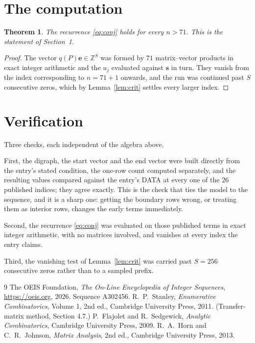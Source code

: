\documentclass[11pt,a4paper]{article}
\theoremstyle{plain}
\newtheorem{theorem}{Theorem}
\theoremstyle{definition}
\begin{document}
\section{The computation}

\begin{theorem}
The recurrence \eqref{eq:conj} holds for every $n>71$. This is the statement of
Section~1.
\end{theorem}

\begin{proof}
The vector $q(P)\mathbf{e}\in\mathbb{Z}^{S}$ was formed by $71$ matrix--vector
products in exact integer arithmetic and the $u_j$ evaluated against $\mathbf{s}$ in turn.
They vanish from the index corresponding to $n=71+1$ onwards, and the run was continued
past $S$ consecutive zeros, which by Lemma~\ref{lem:crit} settles every larger index.
\end{proof}

\section{Verification}

Three checks, each independent of the algebra above.

First, the digraph, the start vector and the end vector were built directly from the
entry's stated condition, the one-row count computed separately, and the resulting values
compared against the entry's DATA at every one of the $26$ published indices; they
agree exactly. This is the check that ties the model to the sequence, and it is a sharp one:
getting the boundary rows wrong, or treating them as interior rows, changes the early terms
immediately.

Second, the recurrence \eqref{eq:conj} was evaluated on those published terms in exact
integer arithmetic, with no matrices involved, and vanishes at every index the entry claims.

Third, the vanishing test of Lemma~\ref{lem:crit} was carried past $S=256$ consecutive
zeros rather than to a sampled prefix.

\begin{thebibliography}{9}
 The OEIS Foundation, \emph{The On-Line Encyclopedia of Integer
Sequences}, \url{https://oeis.org}, 2026. Sequence A302456.
 R.~P.~Stanley, \emph{Enumerative Combinatorics}, Volume 1, 2nd ed.,
Cambridge University Press, 2011. (Transfer-matrix method, Section 4.7.)
 P.~Flajolet and R.~Sedgewick, \emph{Analytic Combinatorics}, Cambridge
University Press, 2009.
 R.~A.~Horn and C.~R.~Johnson, \emph{Matrix Analysis}, 2nd ed., Cambridge
University Press, 2013.
\end{thebibliography}
\end{document}
